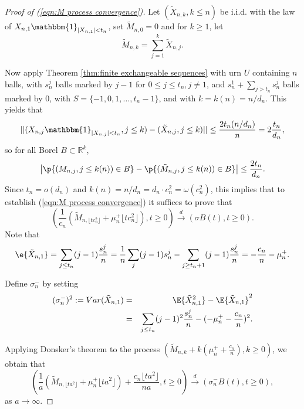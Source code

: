 \begin{proof}[Proof of (\ref{eqn:M process convergence})]
Let $(\tilde{X}_{n,k}, k\le n)$ be i.i.d. with the law of $X_{n,1}\mathbbm{1}_{|X_{n,1}|<t_n}$, set $\tilde{M}_{n,0}=0$ and for $k\ge 1$, let \[\tilde{M}_{n,k}=\sum\limits_{j=1}^k \tilde{X}_{n,j}.\]
 
Now apply Theorem \ref{thm:finite exchangeable sequences} with urn $U$ containing $n$ balls, with $s^j_n$ balls marked by $j-1$ for $0\le j\le t_n, j\neq 1$, and $s^1_n+\sum\limits_{j>t_n}s^j_n$ balls marked by 0, with $S=\{-1,0,1,\ldots, t_n-1\}$, and with $k=k(n)=n/d_n$. This yields that 
\[||(X_{n,j}\mathbbm{1}_{|X_{n,j}|<t_n}, j\le k)-(\tilde{X}_{n,j}, j\le k)||\le \frac{2t_n(n/d_n)}{n}=2\frac{t_n}{d_n},\]
so for all Borel $B\subset\mathbb{R}^k$,
\[\left|\p{(M_{n,j}, j\le k(n))\in B}-\p{(\tilde{M}_{n,j}, j\le k(n))\in B}\right|\le \frac{2t_n}{d_n}.\]
Since $t_n=o(d_n)$ and $k(n)=n/d_n=d_n\cdot c^2_n=\omega(c^2_n)$, this implies that to establish (\ref{eqn:M process convergence}) it suffices to prove that
\begin{equation}\label{eqn: M iid process convergence}
\left(\frac{1}{c_n}(\tilde{M}_{n, \lfloor tc^2_n \rfloor}+\mu^+_n\lfloor tc^2_n \rfloor), t\ge 0 \right)\overset{d}{\to}\left(\sigma B(t), t\ge 0\right).
\end{equation}
Note that
\[\e{\tilde{X}_{n,1}}=\sum\limits_{j\le t_n}(j-1)\frac{s^j_n}{n}= \frac{1}{n}\sum\limits_{j}(j-1)s^j_n-\sum\limits_{j\ge t_n+1}(j-1)\frac{s^j_n}{n}=-\frac{c_n}{n}-\mu^+_n.\]

Define $\sigma^-_n$ by setting 
\begin{eqnarray}\label{eqn: dfn of sigma-}
(\sigma^-_n)^2:=Var(\tilde{X}_{n,1})&=&\E{\tilde{X}^2_{n,1}}-\E{\tilde{X}_{n,1}}^2\nonumber\\
&=&\sum\limits_{j\le t_n}(j-1)^2\frac{s^j_n}{n}-(-\mu^+_n-\frac{c_n}{n})^2.
\end{eqnarray}

Applying Donsker's theorem to the process $\left(\tilde{M}_{n,k}+k(\mu^+_n+\frac{c_n}{n}), k\ge 0\right)$, we obtain that
\begin{equation}\label{eqn:M process finite convergence}
\left(\frac{1}{a}(\tilde{M}_{n, \lfloor ta^2 \rfloor}+\mu^+_n\lfloor ta^2 \rfloor)+\frac{c_n\lfloor ta^2\rfloor}{na}, t\ge 0\right)\overset{d}{\to}\left(\sigma^-_n B(t), t\ge 0\right),
\end{equation}
as $a\to\infty$.


\end{proof}
